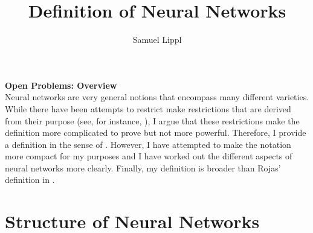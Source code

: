\documentclass[a4paper,11pt]{article}
\title{Definition of Neural Networks}
\author{Samuel Lippl}
\begin{document}
\renewcommand{\abstractname}{\vspace{-\baselineskip}}
\theoremstyle{change} %
\theoremheaderfont{\normalfont\scshape}
\theorembodyfont{\normalfont}
\newtheorem{Def}{Definition}[section]
\newtheorem{The}[Def]{Theorem}
\newtheorem{Lem}[Def]{Lemma}
\newtheorem{Pro}[Def]{Proposition}
\newtheorem{Kor}[Def]{Korollar}
\newtheorem{Bem}[Def]{Bemerkung}
\newtheorem{Not}[Def]{Notation}
\newtheorem{Bei}[Def]{Example}
\newtheorem{Ax}[Def]{Axiom}
\newtheorem{Con}[Def]{Condition}
\newtheorem{Hyp}[Def]{Hypothesis}
\newtheorem{OP}{Open Problem}
\theoremseparator{}
\newtheorem{Abs}[Def]{}
\theoremstyle{nonumberplain}
\theoremheaderfont{\normalfont\itshape}
\theoremsymbol{$\square$}
\newtheorem{Bew}{Proof}
\theoremstyle{change}
\theoremsymbol{}
\theoremheaderfont{\normalfont\scshape}
\newtheorem{BLem}[Def]{Lemma}
\theoremstyle{plain}
\theoremheaderfont{\normalfont\itshape}
\newtheorem{HLem}{Sublemma}[Def]
\newtheorem{BAbs}[HLem]{}
\theoremstyle{nonumberplain}
\theoremheaderfont{\normalfont\itshape}
\theoremsymbol{$\triangle$}
\newtheorem{BBew}{Proof}
\maketitle
\tableofcontents
\textbf{Open Problems: Overview}\\
Neural networks are very general notions that encompass many different varieties. While there have been attempts to restrict make restrictions that are derived from their purpose (see, for instance, \cite{Guresen2011}), I argue that these restrictions make the definition more complicated to prove but not more powerful. Therefore, I provide a definition in the sense of \cite{Rojas1996}. However, I have attempted to make the notation more compact for my purposes and I have worked out the different aspects of neural networks more clearly. Finally, my definition is broader than Rojas' definition in \cite{Rojas1996}.
\section{Structure of Neural Networks}
\end{document}
